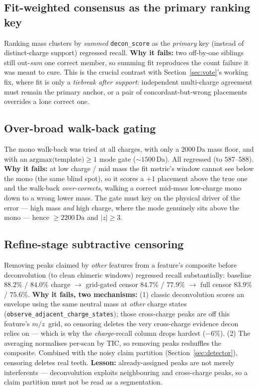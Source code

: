 \documentclass[11pt]{article}
\newcommand{\Da}{\,\text{Da}}
\newcommand{\mz}{\ensuremath{m/z}}
\begin{document}
\subsection{Fit-weighted consensus as the primary ranking key}
\label{sec:neg-fitprimary}
Ranking mass clusters by \emph{summed} \texttt{decon\_score} as the \emph{primary} key (instead of
distinct-charge support) regressed recall. \textbf{Why it fails:} two off-by-one siblings still
out-\emph{sum} one correct member, so summing fit reproduces the count failure it was meant to cure.
This is the crucial contrast with Section~\ref{sec:vote}'s working fix, where fit is only a
\emph{tiebreak after support}: independent multi-charge agreement must remain the primary anchor, or
a pair of concordant-but-wrong placements overrides a lone correct one.

\subsection{Over-broad walk-back gating}
\label{sec:neg-walkback}
The mono walk-back was tried at all charges, with only a $2000\Da$ mass floor, and with an
$\text{argmax(template)} \geq 1$ mode gate ($\sim1500\Da$). All regressed (to $587$--$588$).
\textbf{Why it fails:} at low charge / mid mass the fit metric's window cannot see below the mono
(the same blind spot), so it scores a $+1$ placement above the true one and the walk-back
\emph{over-corrects}, walking a correct mid-mass low-charge mono down to a wrong lower mass. The
gate must key on the physical driver of the error --- high mass \emph{and} high charge, where the
mode genuinely sits above the mono --- hence $\geq 2200\Da$ and $|z| \geq 3$.

\subsection{Refine-stage subtractive censoring}
\label{sec:neg-censor}
Removing peaks claimed by \emph{other} features from a feature's composite before deconvolution
(to clean chimeric windows) regressed recall substantially: baseline $88.2\%$ / $84.0\%$ charge
$\rightarrow$ grid-gated censor $84.7\%$ / $77.9\%$ $\rightarrow$ full censor $83.9\%$ / $75.6\%$.
\textbf{Why it fails, two mechanisms:} (1) classic deconvolution scores an envelope using the same
neutral mass at \emph{other} charge states (\texttt{observe\_adjacent\_charge\_states}); those
cross-charge peaks are off this feature's \mz\ grid, so censoring deletes the very cross-charge
evidence decon relies on --- which is why the \emph{charge}-recall column drops hardest ($-6\%$).
(2) The averaging normalises per-scan by TIC, so removing peaks reshuffles the composite. Combined
with the noisy claim partition (Section~\ref{sec:detector}), censoring deletes real teeth.
\textbf{Lesson:} already-assigned peaks are not merely interferents --- deconvolution exploits
neighbouring and cross-charge peaks, so a claim partition must not be read as a segmentation.
\end{document}
